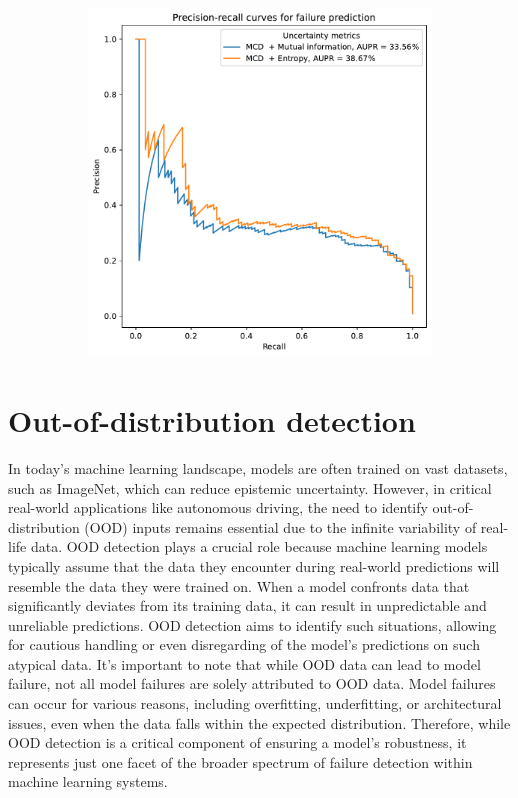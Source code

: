 \begin{figure}[H]
\begin{subfigure}{0.45\textwidth}
        \includegraphics[width=\textwidth]{failure_aupr_entropy_vs_mut_inf.pdf}
        \caption{}
        \label{fig:failure_aupr_entropy_vs_mut_inf}
    \end{subfigure}%
\end{figure}

\section{Out-of-distribution detection}
In today's machine learning landscape, models are often trained on vast datasets, such as ImageNet, which can reduce epistemic uncertainty. However, in critical real-world applications like autonomous driving, the need to identify out-of-distribution (OOD) inputs remains essential due to the infinite variability of real-life data. OOD detection plays a crucial role because machine learning models typically assume that the data they encounter during real-world predictions will resemble the data they were trained on. When a model confronts data that significantly deviates from its training data, it can result in unpredictable and unreliable predictions. OOD detection aims to identify such situations, allowing for cautious handling or even disregarding of the model's predictions on such atypical data. It's important to note that while OOD data can lead to model failure, not all model failures are solely attributed to OOD data. Model failures can occur for various reasons, including overfitting, underfitting, or architectural issues, even when the data falls within the expected distribution. Therefore, while OOD detection is a critical component of ensuring a model's robustness, it represents just one facet of the broader spectrum of failure detection within machine learning systems.

